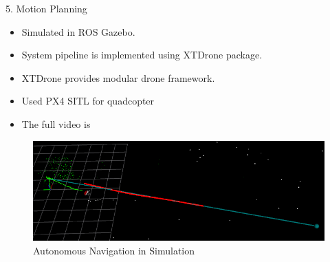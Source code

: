 \documentclass[10pt]{beamer}
\begin{document}
\begin{frame}{}
    \begin{description}
        \item[5. Motion Planning]
    \end{description}
    \begin{itemize}
        \item Simulated in ROS Gazebo.
        \item System pipeline is implemented using XTDrone package.
        \item XTDrone provides modular drone framework.
        \item Used PX4 SITL for quadcopter
        \item The full video is  
    \end{itemize}
    \begin{figure}[!ht]
        \centering
        \includegraphics[scale=0.4]{startraj-1.png}
        \caption{Autonomous Navigation in Simulation}
        \label{fig:xtdrone}
    \end{figure}
    
\end{frame}
\end{document}
